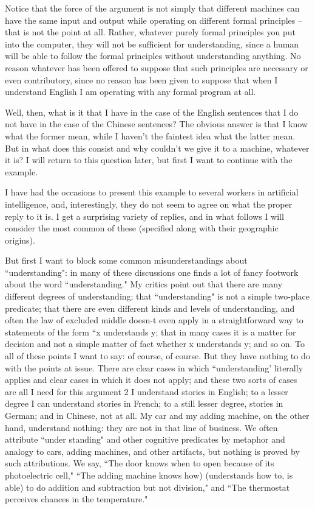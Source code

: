 Notice that the force of the argument is not simply that different machines can have the same input and output
while operating on different formal principles -- that is not the point at all. Rather, whatever purely formal
principles you put into the computer, they will not be sufficient for understanding, since a human will be able to
follow the formal principles without understanding anything. No reason whatever has been offered to suppose
that such principles are necessary or even contributory, since no reason has been given to suppose that when I
understand English I am operating with any formal program at all.

Well, then, what is it that I have in the case of the English sentences that I do not have in the case of the
Chinese sentences? The obvious answer is that I know what the former mean, while I haven't the faintest idea
what the latter mean. But in what does this consist and why couldn't we give it to a machine, whatever it is? I
will return to this question later, but first I want to continue with the example.

I have had the occasions to present this example to several workers in artificial intelligence, and, interestingly,
they do not seem to agree on what the proper reply to it is. I get a surprising variety of replies, and in what
follows I will consider the most common of these (specified along with their geographic origins).

But first I want to block some common misunderstandings about ``understanding": in many of these discussions
one finds a lot of fancy footwork about the word ``understanding." My critics point out that there are many
different degrees of understanding; that ``understanding" is not a simple two-place predicate; that there are even
different kinds and levels of understanding, and often the law of excluded middle doesn-t even apply in a
straightforward way to statements of the form ``x understands y; that in many cases it is a matter for decision and
not a simple matter of fact whether x understands y; and so on. To all of these points I want to say: of course, of
course. But they have nothing to do with the points at issue. There are clear cases in which ``understanding' literally applies and clear cases in which it does not apply; and these two sorts of cases are all I need for this argument 2 I understand stories in English; to a lesser degree I can understand stories in French; to a still lesser
degree, stories in German; and in Chinese, not at all. My car and my adding machine, on the other hand,
understand nothing: they are not in that line of business. We often attribute ``under standing" and other cognitive
predicates by metaphor and analogy to cars, adding machines, and other artifacts, but nothing is proved by such
attributions. We say, ``The door knows when to open because of its photoelectric cell," ``The adding machine
knows how) (understands how to, is able) to do addition and subtraction but not division," and ``The thermostat
perceives chances in the temperature."

